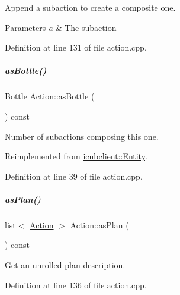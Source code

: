 Append a subaction to create a composite one. 


\begin{DoxyParams}{Parameters}
{\em a} & The subaction \\
\hline
\end{DoxyParams}


Definition at line 131 of file action.\+cpp.

\mbox{\label{group__icubclient__representations_a55fccb7922381a3d9a6657af902368b9}} 
\subparagraph{\texorpdfstring{as\+Bottle()}{asBottle()}}
{\footnotesize\ttfamily Bottle Action\+::as\+Bottle (\begin{DoxyParamCaption}{ }\end{DoxyParamCaption}) const\hspace{0.3cm}{\ttfamily [virtual]}}



Number of subactions composing this one. 



Reimplemented from \hyperlink{group__icubclient__representations_a1481200655f5b88c81a9fa19941fd841}{icubclient\+::\+Entity}.



Definition at line 39 of file action.\+cpp.

\mbox{\label{group__icubclient__representations_a1a840d759c2b5448792307394c3fdf4a}} 
\subparagraph{\texorpdfstring{as\+Plan()}{asPlan()}\hspace{0.1cm}{\footnotesize\ttfamily [1/2]}}
{\footnotesize\ttfamily list$<$ \hyperlink{group__icubclient__representations_classicubclient_1_1Action}{Action} $>$ Action\+::as\+Plan (\begin{DoxyParamCaption}{ }\end{DoxyParamCaption}) const\hspace{0.3cm}{\ttfamily [virtual]}}



Get an unrolled plan description. 



Definition at line 136 of file action.\+cpp.

